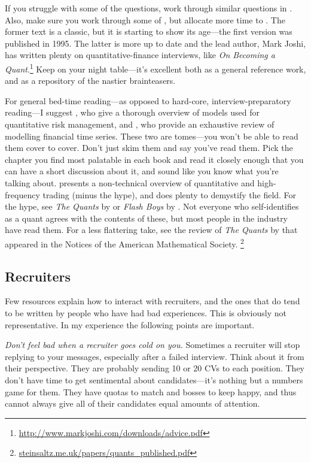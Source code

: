 \documentclass[a4paper]{article}
\begin{document}
If you struggle with some of the questions, work through similar questions in \citep{JoshiQA}.
Also, make sure you work through some of \citet{HeardOnTheStreet}, but allocate more time to \citet{JoshiQA}.
The former text is a classic, but it is starting to show its age---the first version was published in 1995.
The latter is more up to date and the lead author, Mark Joshi, has written plenty on quantitative-finance interviews, like
\emph{On Becoming a Quant}.\footnote{\url{http://www.markjoshi.com/downloads/advice.pdf}}
Keep \citet{WilmottFAQ} on your night table---it's excellent both as a general reference work, and as a repository of the nastier brainteasers.

For general bed-time reading---as opposed to hard-core, interview-preparatory reading---I suggest
\citet{mcneil2015quantitative}, who give a thorough overview of models used for quantitative risk management, and
\citet{andersen2009handbook}, who provide an exhaustive review of modelling financial time series.
These two are tomes---you won't be able to read them cover to cover.
Don't just skim them and say you've read them.
Pick the chapter you find most palatable in each book and read it
closely enough that you can have a short discussion about it, and sound like you know what you're talking about.
\citet{narang2013inside} presents a non-technical overview of quantitative and high-frequency trading (minus the hype), and does plenty to demystify the field.
For the hype, see
\emph{The Quants} by \citet{patterson2010quants}
or
\emph{Flash Boys} by \citet{lewis2014flash}.
Not everyone who self-identifies as a quant agrees with the contents of these, but most people in the industry have read them.
For a less flattering take, see the review of \emph{The Quants} by \citet{steinsaltz2011value} that appeared in the Notices of the American Mathematical Society.%
\footnote{\url{steinsaltz.me.uk/papers/quants_published.pdf}}

{}
\subsection*{Recruiters}
Few resources explain how to interact with recruiters, and the ones that do tend to be written by people who have had bad experiences.
This is obviously not representative.
In my experience the following points are important.

\emph{Don't feel bad when a recruiter goes cold on you.}
Sometimes a recruiter will stop replying to your messages, especially after a failed interview.
Think about it from their perspective.
They are probably sending 10 or 20 CVs to each position.
They don't have time to get sentimental about candidates---it's nothing but a numbers game for them.
They have quotas to match and bosses to keep happy, and thus cannot always give all of their candidates equal amounts of attention.
\end{document}
